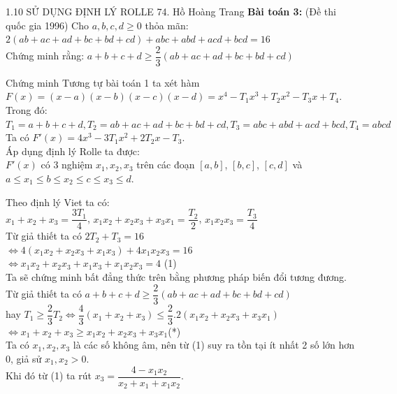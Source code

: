 \begin{frame}{{1.10 SỬ DỤNG ĐỊNH LÝ ROLLE \hspace{4cm}  74. Hồ Hoàng Trang}}
  \textbf{Bài toán 3:} (Đề thi quốc gia 1996) Cho $a,b,c,d \ge 0$ thỏa mãn:  $2(ab+ac+ad+bc+bd+cd)+abc+abd+acd+bcd=16$\\
  Chứng minh rằng: $a+b+c+d \ge \dfrac{2}{3}(ab+ac+ad+bc+bd+cd)$
  \pause
  \begin{block}{Chứng minh}
  \pause
    Tương tự bài toán 1 ta xét hàm $F(x)=(x-a)(x-b)(x-c)(x-d)=x^4-T_1x^3+T_2x^2-T_3x+T_4$.\\
    Trong đó:\\
   $T_1=a+b+c+d, T_2=ab+ac+ad+bc+bd+cd, T_3=abc+abd+acd+bcd, T_4=abcd$\\
   \pause
   Ta có $F'(x)=4x^3-3T_1x^2+2T_2x-T_3$.\\
   \pause
    Áp dụng định lý Rolle ta được:\\ 
    $F'(x)$ có 3 nghiệm $x_1, x_2, x_3$ trên các đoạn $\left[a,b\right]$, $\left[b,c\right]$, $\left[c,d\right]$ và $a\le x_1 \le b \le x_2 \le c \le x_3 \le d$.\\
    \end{block}
\end{frame}
    \begin{frame}
    \begin{block}
        
        Theo định lý Viet ta có:\\
    $x_1+x_2+x_3=\dfrac{3T_1}{4} $, 
    $x_1x_2+x_2x_3+x_3x_1=\dfrac{T_2}{2}$, $x_1x_2x_3=\dfrac{T_3}{4}$\\
    \pause
    Từ giả thiết ta có $2T_2+T_3=16$ \\
    $\Leftrightarrow 4(x_1x_2+x_2x_3+x_1x_3)+4x_1x_2x_3=16$\\
     $\Leftrightarrow x_1x_2+x_2x_3+x_1x_3+x_1x_2x_3=4$ (1)\\
     \pause
     Ta sẽ chứng minh bất đẳng thức trên bằng phương pháp biến đổi tương đương.\\
     \pause
     Từ giả thiết ta có 
      $a+b+c+d \ge \dfrac{2}{3}(ab+ac+ad+bc+bd+cd)$\\
      hay $T_1 \ge \dfrac{2}{3}T_2\Leftrightarrow \dfrac{4}{3}(x_1+x_2+x_3)\le \dfrac{2}{3}.2(x_1x_2+x_2x_3+x_3x_1)$\\
      $\Leftrightarrow x_1+x_2+x_3\ge x_1x_2+x_2x_3+x_3x_1$(*)\\
      \pause
       Ta có $x_1, x_2, x_3$ là các số không âm, nên từ (1) suy ra tồn tại ít nhất 2 số lớn hơn 0, giả sử $x_1, x_2>0$.\\
       Khi đó từ (1) ta rút $x_3=\dfrac{4-x_1x_2}{x_2+x_1+x_1x_2}$.\\
       
    \end{block}
    \end{frame}
